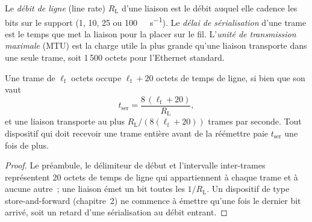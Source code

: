 \begin{definition}\label{def:nw:networking-for-trading:ser}
Le \emph{débit de ligne} (line rate) $R_{\mathrm L}$ d'une liaison est le débit auquel elle cadence les bits sur le support (1, 10, 25
ou \qty{100}{\giga\bit\per\second}). Le \emph{délai de sérialisation} d'une trame est le temps que met la liaison
pour la placer sur le fil. L'\emph{unité de transmission maximale} (MTU) est la charge utile la plus grande qu'une
liaison transporte dans une seule trame, soit 1\,500 octets pour l'Ethernet standard.
\end{definition}

\begin{proposition}\label{prop:nw:networking-for-trading:ser}
Une trame de $\ell_{\mathrm f}$ octets occupe $\ell_{\mathrm f} + 20$ octets de temps de ligne, si bien que son  vaut
\[
  t_{\mathrm{ser}} = \frac{8\,(\ell_{\mathrm f} + 20)}{R_{\mathrm L}},
\]
et une liaison transporte au plus $R_{\mathrm L} / (8(\ell_{\mathrm f}+20))$ trames par seconde. Tout dispositif qui doit recevoir une trame entière
avant de la réémettre paie $t_{\mathrm{ser}}$ une fois de plus.
\end{proposition}

\begin{proof}
Le préambule, le délimiteur de début et l'intervalle inter-trames représentent 20 octets de temps de ligne qui appartiennent à chaque trame et à aucune autre~;
une liaison émet un bit toutes les $1/R_{\mathrm L}$. Un dispositif de type store-and-forward (chapitre~2) ne commence à émettre qu'une fois le dernier bit
arrivé, soit un retard d'une sérialisation au débit entrant.
\end{proof}

